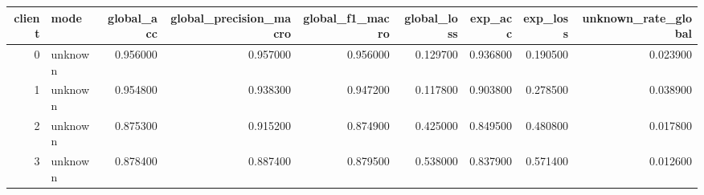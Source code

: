 \begin{tabular}{rlrrrrrrr}
\toprule
client & mode & global_acc & global_precision_macro & global_f1_macro & global_loss & exp_acc & exp_loss & unknown_rate_global \\
\midrule
0 & unknown & 0.956000 & 0.957000 & 0.956000 & 0.129700 & 0.936800 & 0.190500 & 0.023900 \\
1 & unknown & 0.954800 & 0.938300 & 0.947200 & 0.117800 & 0.903800 & 0.278500 & 0.038900 \\
2 & unknown & 0.875300 & 0.915200 & 0.874900 & 0.425000 & 0.849500 & 0.480800 & 0.017800 \\
3 & unknown & 0.878400 & 0.887400 & 0.879500 & 0.538000 & 0.837900 & 0.571400 & 0.012600 \\
\bottomrule
\end{tabular}
